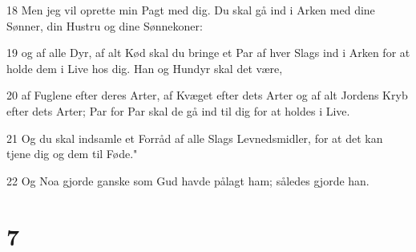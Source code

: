 \par 18 Men jeg vil oprette min Pagt med dig. Du skal gå ind i Arken med dine Sønner, din Hustru og dine Sønnekoner:
\par 19 og af alle Dyr, af alt Kød skal du bringe et Par af hver Slags ind i Arken for at holde dem i Live hos dig. Han og Hundyr skal det være,
\par 20 af Fuglene efter deres Arter, af Kvæget efter dets Arter og af alt Jordens Kryb efter dets Arter; Par for Par skal de gå ind til dig for at holdes i Live.
\par 21 Og du skal indsamle et Forråd af alle Slags Levnedsmidler, for at det kan tjene dig og dem til Føde."
\par 22 Og Noa gjorde ganske som Gud havde pålagt ham; således gjorde han.

\chapter{7}

